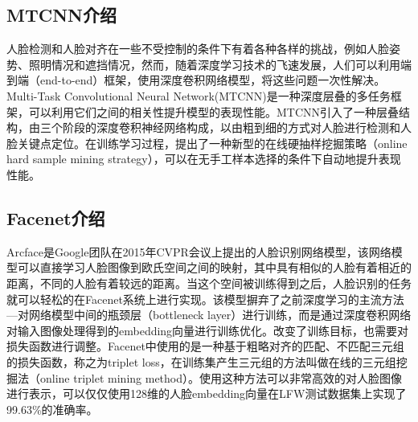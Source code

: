 \subsection{MTCNN介绍}
人脸检测和人脸对齐在一些不受控制的条件下有着各种各样的挑战，例如人脸姿势、照明情况和遮挡情况，然而，随着深度学习技术的飞速发展，人们可以利用端到端（end-to-end）框架，使用深度卷积网络模型，将这些问题一次性解决。Multi-Task Convolutional Neural Network(MTCNN\cite{mtcnn})是一种深度层叠的多任务框架，可以利用它们之间的相关性提升模型的表现性能。MTCNN引入了一种层叠结构，由三个阶段的深度卷积神经网络构成，以由粗到细的方式对人脸进行检测和人脸关键点定位。在训练学习过程，提出了一种新型的在线硬抽样挖掘策略（online hard sample mining strategy），可以在无手工样本选择的条件下自动地提升表现性能。

\subsection{Facenet介绍}

Arcface\cite{facenet}是Google团队在2015年CVPR会议上提出的人脸识别网络模型，该网络模型可以直接学习人脸图像到欧氏空间之间的映射，其中具有相似的人脸有着相近的距离，不同的人脸有着较远的距离。当这个空间被训练得到之后，人脸识别的任务就可以轻松的在Facenet系统上进行实现。该模型摒弃了之前深度学习的主流方法---对网络模型中间的瓶颈层（bottleneck layer）进行训练，而是通过深度卷积网络对输入图像处理得到的embedding向量进行训练优化。改变了训练目标，也需要对损失函数进行调整。Facenet中使用的是一种基于粗略对齐的匹配、不匹配三元组的损失函数，称之为triplet loss，在训练集产生三元组的方法叫做在线的三元组挖掘法（online triplet mining method）。使用这种方法可以非常高效的对人脸图像进行表示，可以仅仅使用128维的人脸embedding向量在LFW测试数据集上实现了99.63\%的准确率。